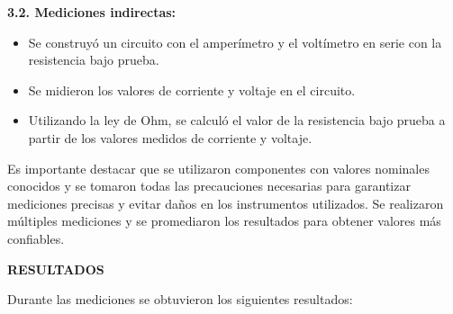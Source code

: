 \documentclass[12pt]{article}
\begin{document}
\begin{enumerate}
		\textbf{3.2. Mediciones indirectas:}
		
		\begin{itemize}
			\item Se construyó un circuito con el amperímetro y el voltímetro en serie con la resistencia bajo prueba.
			\item Se midieron los valores de corriente y voltaje en el circuito.
			\item Utilizando la ley de Ohm, se calculó el valor de la resistencia bajo prueba a partir de los valores medidos de corriente y voltaje.
		\end{itemize}
		
	\end{enumerate}
	
	Es importante destacar que se utilizaron componentes con valores nominales conocidos y se tomaron todas las precauciones necesarias para garantizar mediciones precisas y evitar daños en los instrumentos utilizados. Se realizaron múltiples mediciones y se promediaron los resultados para obtener valores más confiables.

	\newpage
	
	\begin{center}
		\textbf{\large RESULTADOS}\\
	\end{center}
	
	\noindent Durante las mediciones se obtuvieron los siguientes resultados:
	
\end{document}
